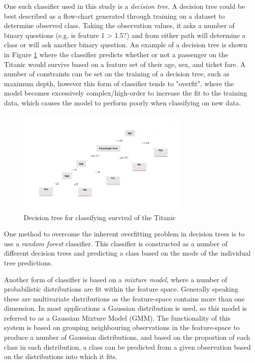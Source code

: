 One such classifier used in this study is a \emph{decision tree}. A decision tree could be best described as a flow-chart generated through training on a dataset to determine observed class. Taking the observation values, it asks a number of binary questions (e.g. is feature 1 > 1.5?) and from either path will determine a class or will ask another binary question. An example of a decision tree is shown in Figure \ref{fig:decisionTreeTitanic} where the classifier predicts whether or not a passenger on the Titanic would survive based on a feature set of their age, sex, and ticket fare. A number of constraints can be set on the training of a decision tree, such as maximum depth, however this form of classifier tends to "overfit", where the model becomes excessively complex/high-order to increase the fit to the training data, which causes the model to perform poorly when classifying on new data.\\
\begin{figure}[ht]
    \centering
    \includegraphics[width=0.75\textwidth]{02-Background/decision_tree.png}
    \caption{Decision tree for classifying survival of the Titanic}
    \label{fig:decisionTreeTitanic}
\end{figure}
One method to overcome the inherent overfitting problem in decision trees is to use a \emph{random forest} classifier. This classifier is constructed as a number of different decision trees and predicting a class based on the mode of the individual tree predictions.

\par

Another form of classifier is based on a \emph{mixture model}, where a number of probabilistic distributions are fit within the feature space. Generally speaking these are multivariate distributions as the feature-space contains more than one dimension. In most applications a Gaussian distribution is used, so this model is referred to as a Gaussian Mixture Model (GMM). The functionality of this system is based on grouping neighbouring observations in the feature-space to produce a number of Gaussian distributions, and based on the proportion of each class in each distribution, a class can be predicted from a given observation based on the distributions into which it fits.

